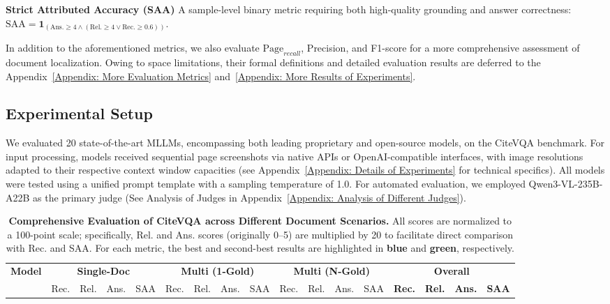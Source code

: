 \documentclass[]{opendatalab}
\newcommand{\highlightgreen}[1]{\colorbox[HTML]{d3ff9f}{\textbf{#1}}}
\newcommand{\highlightblue}[1]{\colorbox[HTML]{bae6fb}{\textbf{#1}}}
\begin{document}
{\textbf{Strict Attributed Accuracy (SAA)} A sample-level binary metric requiring both high-quality grounding and answer correctness: $\text{SAA} = \mathbf{1}_{(\text{Ans.} \ge 4 \land (\text{Rel.} \ge 4 \lor \text{Rec.} \ge 0.6))}$.

In addition to the aforementioned metrics, we also evaluate $\text{Page}_{recall}$, Precision, and F1-score for a more comprehensive assessment of document localization. Owing to space limitations, their formal definitions and detailed evaluation results are deferred to the Appendix~\ref{Appendix: More Evaluation Metrics} and~\ref{Appendix: More Results of Experiments}.

\subsection{Experimental Setup}
\label{Experimental Setup}
We evaluated 20 state-of-the-art MLLMs, encompassing both leading proprietary and open-source models, on the CiteVQA benchmark. For input processing, models received sequential page screenshots via native APIs or OpenAI-compatible interfaces, with image resolutions adapted to their respective context window capacities (see Appendix~\ref{Appendix: Details of Experiments} for technical specifics). All models were tested using a unified prompt template with a sampling temperature of 1.0. For automated evaluation, we employed Qwen3-VL-235B-A22B as the primary judge (See Analysis of Judges in Appendix~\ref{Appendix: Analysis of Different Judges}).


\begin{table}[t]
\centering
\scriptsize
\renewcommand{\arraystretch}{1.25}
\setlength{\tabcolsep}{1.0pt}
\caption{\textbf{Comprehensive Evaluation of CiteVQA across Different Document Scenarios.} All scores are normalized to a 100-point scale; specifically, Rel. and Ans. scores (originally 0--5) are multiplied by 20 to facilitate direct comparison with Rec. and SAA. For each metric, the best and second-best results are highlighted in \highlightblue{blue} and \highlightgreen{green}, respectively.}
\label{tab:main_results}

\begin{tabular}{@{}l cccc cccc cccc >{\bfseries}c>{\bfseries}c>{\bfseries}c>{\bfseries}c@{}}
\toprule
\multirow{2.5}{*}{\textbf{Model}} & \multicolumn{4}{c}{\textbf{Single-Doc}} & \multicolumn{4}{c}{\textbf{Multi (1-Gold)}} & \multicolumn{4}{c}{\textbf{Multi (N-Gold)}} & \multicolumn{4}{c}{\textbf{Overall}} \\
\cmidrule(lr){2-5} \cmidrule(lr){6-9} \cmidrule(lr){10-13} \cmidrule(l){14-17}
& Rec. & Rel. & Ans. & SAA & Rec. & Rel. & Ans. & SAA & Rec. & Rel. & Ans. & SAA & Rec. & Rel. & Ans. & SAA \\ \midrule


\end{tabular}
\end{table}}
\end{document}
